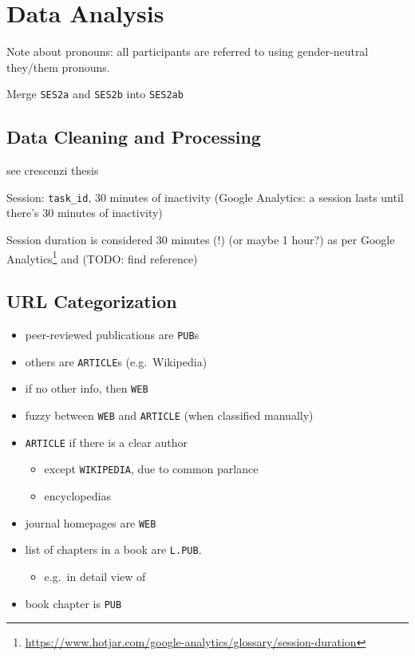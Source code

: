 \documentclass[letterpaper, nobind]{templates/ociamthesis}
\providecommand{\tightlist}{%
  \setlength{\itemsep}{0pt}\setlength{\parskip}{0pt}}
\begin{document}
\hypertarget{data-analysis}{%
\chapter{Data Analysis}\label{data-analysis}}

Note about pronouns:
all participants are referred to using gender-neutral they/them pronouns.

Merge \texttt{SES2a} and \texttt{SES2b} into \texttt{SES2ab}

\hypertarget{data-cleaning-and-processing}{%
\section{Data Cleaning and Processing}\label{data-cleaning-and-processing}}

see crescenzi thesis

Session: \texttt{task\_id}, 30 minutes of inactivity
(Google Analytics: a session lasts until there's 30 minutes of inactivity)

Session duration is considered 30 minutes (!) (or maybe 1 hour?)
as per Google Analytics\footnote{\url{https://www.hotjar.com/google-analytics/glossary/session-duration}} and (TODO: find reference)

\hypertarget{url-categorization}{%
\section{URL Categorization}\label{url-categorization}}

\begin{itemize}
\tightlist
\item
  peer-reviewed publications are \texttt{PUB}s
\item
  others are \texttt{ARTICLE}s (e.g.~Wikipedia)
\item
  if no other info, then \texttt{WEB}
\item
  fuzzy between \texttt{WEB} and \texttt{ARTICLE} (when classified manually)
\item
  \texttt{ARTICLE} if there is a clear author

  \begin{itemize}
  \tightlist
  \item
    except \texttt{WIKIPEDIA}, due to common parlance
  \item
    encyclopedias
  \end{itemize}
\item
  journal homepages are \texttt{WEB}
\item
  list of chapters in a book are \texttt{L.PUB}.

  \begin{itemize}
  \tightlist
  \item
    e.g.~in detail view of
  \end{itemize}
\item
  book chapter is \texttt{PUB}
\end{itemize}
\end{document}
